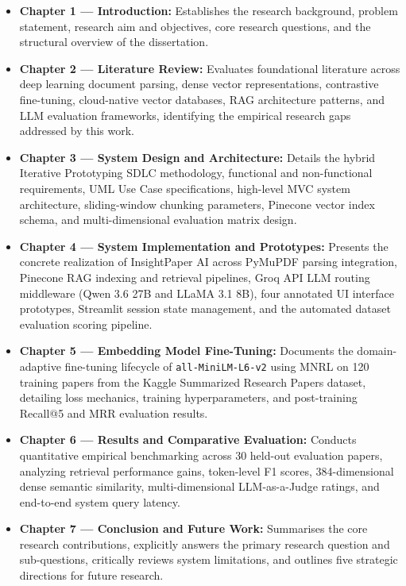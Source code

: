\begin{itemize}
    \item \textbf{Chapter 1 — Introduction:} Establishes the research background, problem statement, research aim and objectives, core research questions, and the structural overview of the dissertation.
    \item \textbf{Chapter 2 — Literature Review:} Evaluates foundational literature across deep learning document parsing, dense vector representations, contrastive fine-tuning, cloud-native vector databases, RAG architecture patterns, and LLM evaluation frameworks, identifying the empirical research gaps addressed by this work.
    \item \textbf{Chapter 3 — System Design and Architecture:} Details the hybrid Iterative Prototyping SDLC methodology, functional and non-functional requirements, UML Use Case specifications, high-level MVC system architecture, sliding-window chunking parameters, Pinecone vector index schema, and multi-dimensional evaluation matrix design.
    \item \textbf{Chapter 4 — System Implementation and Prototypes:} Presents the concrete realization of InsightPaper AI across PyMuPDF parsing integration, Pinecone RAG indexing and retrieval pipelines, Groq API LLM routing middleware (Qwen 3.6 27B and LLaMA 3.1 8B), four annotated UI interface prototypes, Streamlit session state management, and the automated dataset evaluation scoring pipeline.
    \item \textbf{Chapter 5 — Embedding Model Fine-Tuning:} Documents the domain-adaptive fine-tuning lifecycle of \texttt{all-MiniLM-L6-v2} using MNRL on 120 training papers from the Kaggle Summarized Research Papers dataset, detailing loss mechanics, training hyperparameters, and post-training Recall@5 and MRR evaluation results.
    \item \textbf{Chapter 6 — Results and Comparative Evaluation:} Conducts quantitative empirical benchmarking across 30 held-out evaluation papers, analyzing retrieval performance gains, token-level F1 scores, 384-dimensional dense semantic similarity, multi-dimensional LLM-as-a-Judge ratings, and end-to-end system query latency.
    \item \textbf{Chapter 7 — Conclusion and Future Work:} Summarises the core research contributions, explicitly answers the primary research question and sub-questions, critically reviews system limitations, and outlines five strategic directions for future research.
\end{itemize}
